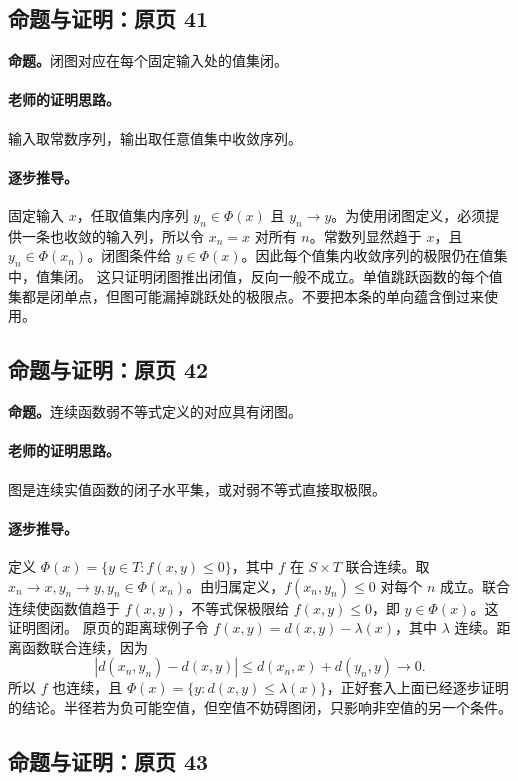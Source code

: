 \documentclass[11pt,a4paper]{article}
\theoremstyle{definition}\newtheorem{definition}{定义}\newtheorem{example}{例}
\begin{document}
\subsection{命题与证明：原页 41}

\textbf{命题。}闭图对应在每个固定输入处的值集闭。

\paragraph{老师的证明思路。}输入取常数序列，输出取任意值集中收敛序列。

\paragraph{逐步推导。}
固定输入 $x$，任取值集内序列 $y_n\in\Phi(x)$ 且 $y_n\to y$。为使用闭图定义，必须提供一条也收敛的输入列，所以令 $x_n=x$ 对所有 $n$。常数列显然趋于 $x$，且 $y_n\in\Phi(x_n)$。闭图条件给 $y\in\Phi(x)$。因此每个值集内收敛序列的极限仍在值集中，值集闭。
这只证明闭图推出闭值，反向一般不成立。单值跳跃函数的每个值集都是闭单点，但图可能漏掉跳跃处的极限点。不要把本条的单向蕴含倒过来使用。


\subsection{命题与证明：原页 42}

\textbf{命题。}连续函数弱不等式定义的对应具有闭图。

\paragraph{老师的证明思路。}图是连续实值函数的闭子水平集，或对弱不等式直接取极限。

\paragraph{逐步推导。}
定义 $\Phi(x)=\{y\in T:f(x,y)\le0\}$，其中 $f$ 在 $S\times T$ 联合连续。取 $x_n\to x,y_n\to y,y_n\in\Phi(x_n)$。由归属定义，$f(x_n,y_n)\le0$ 对每个 $n$ 成立。联合连续使函数值趋于 $f(x,y)$，不等式保极限给 $f(x,y)\le0$，即 $y\in\Phi(x)$。这证明图闭。
原页的距离球例子令 $f(x,y)=d(x,y)-\lambda(x)$，其中 $\lambda$ 连续。距离函数联合连续，因为
\[|d(x_n,y_n)-d(x,y)|\le d(x_n,x)+d(y_n,y)\to0.\]
所以 $f$ 也连续，且 $\Phi(x)=\{y:d(x,y)\le\lambda(x)\}$，正好套入上面已经逐步证明的结论。半径若为负可能空值，但空值不妨碍图闭，只影响非空值的另一个条件。


\subsection{命题与证明：原页 43}
\end{document}
